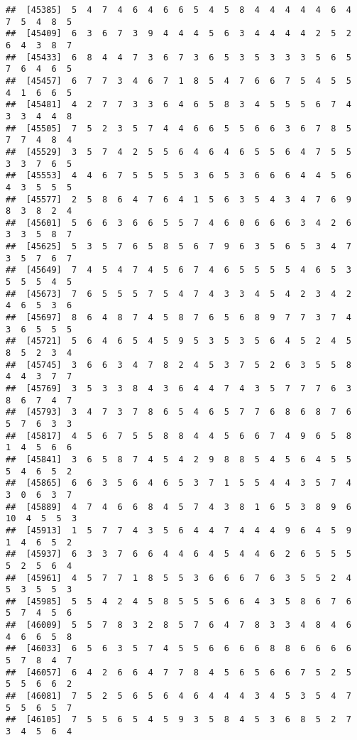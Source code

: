 \documentclass[
]{book}
\begin{document}
\begin{verbatim}
##  [45385]  5  4  7  4  6  4  6  6  5  4  5  8  4  4  4  4  4  6  4  7  5  4  8  5
##  [45409]  6  3  6  7  3  9  4  4  4  5  6  3  4  4  4  4  2  5  2  6  4  3  8  7
##  [45433]  6  8  4  4  7  3  6  7  3  6  5  3  5  3  3  3  5  6  5  7  6  4  6  5
##  [45457]  6  7  7  3  4  6  7  1  8  5  4  7  6  6  7  5  4  5  5  4  1  6  6  5
##  [45481]  4  2  7  7  3  3  6  4  6  5  8  3  4  5  5  5  6  7  4  3  3  4  4  8
##  [45505]  7  5  2  3  5  7  4  4  6  6  5  5  6  6  3  6  7  8  5  7  7  4  8  4
##  [45529]  3  5  7  4  2  5  5  6  4  6  4  6  5  5  6  4  7  5  5  3  3  7  6  5
##  [45553]  4  4  6  7  5  5  5  5  3  6  5  3  6  6  6  4  4  5  6  4  3  5  5  5
##  [45577]  2  5  8  6  4  7  6  4  1  5  6  3  5  4  3  4  7  6  9  8  3  8  2  4
##  [45601]  5  6  6  3  6  6  5  5  7  4  6  0  6  6  6  3  4  2  6  3  3  5  8  7
##  [45625]  5  3  5  7  6  5  8  5  6  7  9  6  3  5  6  5  3  4  7  3  5  7  6  7
##  [45649]  7  4  5  4  7  4  5  6  7  4  6  5  5  5  5  4  6  5  3  5  5  5  4  5
##  [45673]  7  6  5  5  5  7  5  4  7  4  3  3  4  5  4  2  3  4  2  4  6  5  3  6
##  [45697]  8  6  4  8  7  4  5  8  7  6  5  6  8  9  7  7  3  7  4  3  6  5  5  5
##  [45721]  5  6  4  6  5  4  5  9  5  3  5  3  5  6  4  5  2  4  5  8  5  2  3  4
##  [45745]  3  6  6  3  4  7  8  2  4  5  3  7  5  2  6  3  5  5  8  4  4  3  7  7
##  [45769]  3  5  3  3  8  4  3  6  4  4  7  4  3  5  7  7  7  6  3  8  6  7  4  7
##  [45793]  3  4  7  3  7  8  6  5  4  6  5  7  7  6  8  6  8  7  6  5  7  6  3  3
##  [45817]  4  5  6  7  5  5  8  8  4  4  5  6  6  7  4  9  6  5  8  1  4  5  6  6
##  [45841]  3  6  5  8  7  4  5  4  2  9  8  8  5  4  5  6  4  5  5  5  4  6  5  2
##  [45865]  6  6  3  5  6  4  6  5  3  7  1  5  5  4  4  3  5  7  4  3  0  6  3  7
##  [45889]  4  7  4  6  6  8  4  5  7  4  3  8  1  6  5  3  8  9  6 10  4  5  5  3
##  [45913]  1  5  7  7  4  3  5  6  4  4  7  4  4  4  9  6  4  5  9  1  4  6  5  2
##  [45937]  6  3  3  7  6  6  4  4  6  4  5  4  4  6  2  6  5  5  5  5  2  5  6  4
##  [45961]  4  5  7  7  1  8  5  5  3  6  6  6  7  6  3  5  5  2  4  5  3  5  5  3
##  [45985]  5  5  4  2  4  5  8  5  5  5  6  6  4  3  5  8  6  7  6  5  7  4  5  6
##  [46009]  5  5  7  8  3  2  8  5  7  6  4  7  8  3  3  4  8  4  6  4  6  6  5  8
##  [46033]  6  5  6  3  5  7  4  5  5  6  6  6  6  8  8  6  6  6  6  5  7  8  4  7
##  [46057]  6  4  2  6  6  4  7  7  8  4  5  6  5  6  6  7  5  2  5  5  5  6  6  2
##  [46081]  7  5  2  5  6  5  6  4  6  4  4  4  3  4  5  3  5  4  7  5  5  6  5  7
##  [46105]  7  5  5  6  5  4  5  9  3  5  8  4  5  3  6  8  5  2  7  3  4  5  6  4

\end{verbatim}
\end{document}
